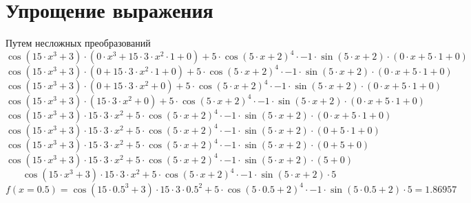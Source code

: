 \documentclass[12pt, a4paper]{report}
\begin{document}
\section{Упрощение выражения}
Путем несложных преобразований
\begin{dmath*}
\cos{(15 \cdot  x  ^ {3} + 3)} \cdot  ( 0 \cdot  x  ^ {3} + 15 \cdot 3 \cdot  x  ^ {2} \cdot 1 + 0 )  + 5 \cdot \cos{(5 \cdot  x  + 2)} ^ {4} \cdot -1 \cdot \sin{(5 \cdot  x  + 2)} \cdot  ( 0 \cdot  x  + 5 \cdot 1 + 0 ) \end{dmath*}
\begin{dmath*}
\cos{(15 \cdot  x  ^ {3} + 3)} \cdot  ( 0 + 15 \cdot 3 \cdot  x  ^ {2} \cdot 1 + 0 )  + 5 \cdot \cos{(5 \cdot  x  + 2)} ^ {4} \cdot -1 \cdot \sin{(5 \cdot  x  + 2)} \cdot  ( 0 \cdot  x  + 5 \cdot 1 + 0 ) \end{dmath*}
\begin{dmath*}
\cos{(15 \cdot  x  ^ {3} + 3)} \cdot  ( 0 + 15 \cdot 3 \cdot  x  ^ {2} + 0 )  + 5 \cdot \cos{(5 \cdot  x  + 2)} ^ {4} \cdot -1 \cdot \sin{(5 \cdot  x  + 2)} \cdot  ( 0 \cdot  x  + 5 \cdot 1 + 0 ) \end{dmath*}
\begin{dmath*}
\cos{(15 \cdot  x  ^ {3} + 3)} \cdot  ( 15 \cdot 3 \cdot  x  ^ {2} + 0 )  + 5 \cdot \cos{(5 \cdot  x  + 2)} ^ {4} \cdot -1 \cdot \sin{(5 \cdot  x  + 2)} \cdot  ( 0 \cdot  x  + 5 \cdot 1 + 0 ) \end{dmath*}
\begin{dmath*}
\cos{(15 \cdot  x  ^ {3} + 3)} \cdot 15 \cdot 3 \cdot  x  ^ {2} + 5 \cdot \cos{(5 \cdot  x  + 2)} ^ {4} \cdot -1 \cdot \sin{(5 \cdot  x  + 2)} \cdot  ( 0 \cdot  x  + 5 \cdot 1 + 0 ) \end{dmath*}
\begin{dmath*}
\cos{(15 \cdot  x  ^ {3} + 3)} \cdot 15 \cdot 3 \cdot  x  ^ {2} + 5 \cdot \cos{(5 \cdot  x  + 2)} ^ {4} \cdot -1 \cdot \sin{(5 \cdot  x  + 2)} \cdot  ( 0 + 5 \cdot 1 + 0 ) \end{dmath*}
\begin{dmath*}
\cos{(15 \cdot  x  ^ {3} + 3)} \cdot 15 \cdot 3 \cdot  x  ^ {2} + 5 \cdot \cos{(5 \cdot  x  + 2)} ^ {4} \cdot -1 \cdot \sin{(5 \cdot  x  + 2)} \cdot  ( 0 + 5 + 0 ) \end{dmath*}
\begin{dmath*}
\cos{(15 \cdot  x  ^ {3} + 3)} \cdot 15 \cdot 3 \cdot  x  ^ {2} + 5 \cdot \cos{(5 \cdot  x  + 2)} ^ {4} \cdot -1 \cdot \sin{(5 \cdot  x  + 2)} \cdot  ( 5 + 0 ) \end{dmath*}
\begin{dmath*}
\cos{(15 \cdot  x  ^ {3} + 3)} \cdot 15 \cdot 3 \cdot  x  ^ {2} + 5 \cdot \cos{(5 \cdot  x  + 2)} ^ {4} \cdot -1 \cdot \sin{(5 \cdot  x  + 2)} \cdot 5\end{dmath*}
\begin{dmath*}
f(x = 0.5) = \cos{(15 \cdot 0.5 ^ {3} + 3)} \cdot 15 \cdot 3 \cdot 0.5 ^ {2} + 5 \cdot \cos{(5 \cdot 0.5 + 2)} ^ {4} \cdot -1 \cdot \sin{(5 \cdot 0.5 + 2)} \cdot 5 = 1.86957\end{dmath*}
\end{document}
